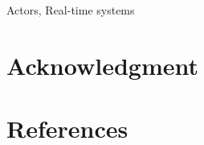 \documentclass[conference]{IEEEtran}
\begin{document}
	\begin{IEEEkeywords}
		Actors, Real-time systems\end{IEEEkeywords}
	









	
	
	
	\section*{Acknowledgment}
	\section*{References}
	
	
	
	
	
	
\end{document}
